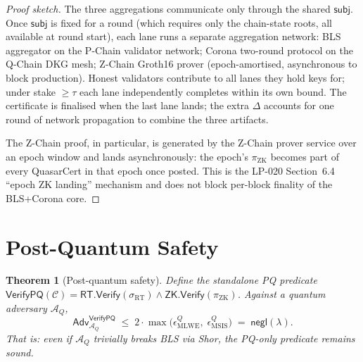 \documentclass[11pt]{article}
\newtheorem{theorem}{Theorem}
\begin{document}
\begin{proof}[Proof sketch]
The three aggregations communicate only through the shared
$\mathsf{subj}$.  Once $\mathsf{subj}$ is fixed for a round (which
requires only the chain-state roots, all available at round start),
each lane runs a separate aggregation network:
BLS aggregator on the P-Chain validator network;
Corona two-round protocol on the Q-Chain DKG mesh;
Z-Chain Groth16 prover (epoch-amortised, asynchronous to block
production).  Honest validators contribute to all lanes they hold keys
for; under stake $\geq \tau$ each lane independently completes within
its own bound.  The certificate is finalised when the last lane lands;
the extra $\Delta$ accounts for one round of network propagation to
combine the three artifacts.

\medskip\noindent
The Z-Chain proof, in particular, is generated by the Z-Chain prover
service over an epoch window and lands asynchronously: the epoch's
$\pi_{\mathrm{ZK}}$ becomes part of every QuasarCert in that epoch
once posted.  This is the LP-020 Section~6.4 ``epoch ZK landing''
mechanism and does not block per-block finality of the BLS+Corona
core.
\end{proof}

\section{Post-Quantum Safety}
\label{sec:pq}

\begin{theorem}[Post-quantum safety]
\label{thm:pq}
Define the standalone PQ predicate
$\mathsf{VerifyPQ}(\mathcal{C}) = \mathsf{RT.Verify}(\sigma_{\mathrm{RT}})
\land \mathsf{ZK.Verify}(\pi_{\mathrm{ZK}})$.  Against a quantum
adversary $\mathcal{A}_Q$,
\[
  \mathsf{Adv}^{\mathsf{VerifyPQ}}_{\mathcal{A}_Q}
  \;\leq\;
  2 \cdot \max\!\bigl(
    \epsilon_{\mathrm{MLWE}}^{Q},\;
    \epsilon_{\mathrm{MSIS}}^{Q}
  \bigr)
  \;=\; \mathsf{negl}(\lambda).
\]
That is: even if $\mathcal{A}_Q$ trivially breaks BLS via Shor, the
PQ-only predicate remains sound.
\end{theorem}
\end{document}
